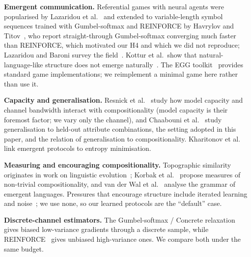 \textbf{Emergent communication.} Referential games with neural agents were popularised by Lazaridou et al.~\cite{lazaridou2016multi} and extended to variable-length symbol sequences trained with Gumbel-softmax and REINFORCE by Havrylov and Titov~\cite{havrylov2017emergence}, who report straight-through Gumbel-softmax converging much faster than REINFORCE, which motivated our H4 and which we did not reproduce; Lazaridou and Baroni survey the field~\cite{lazaridou2020emergent}. Kottur et al.\ show that natural-language-like structure does not emerge naturally~\cite{kottur2017natural}. The EGG toolkit~\cite{kharitonov2019egg} provides standard game implementations; we reimplement a minimal game here rather than use it.

\textbf{Capacity and generalisation.} Resnick et al.~\cite{resnick2019capacity} study how model capacity and channel bandwidth interact with compositionality (model capacity is their foremost factor; we vary only the channel), and Chaabouni et al.~\cite{chaabouni2020compositionality} study generalisation to held-out attribute combinations, the setting adopted in this paper, and the relation of generalisation to compositionality. Kharitonov et al.~\cite{kharitonov2019entropy} link emergent protocols to entropy minimisation.

\textbf{Measuring and encouraging compositionality.} Topographic similarity originates in work on linguistic evolution~\cite{brighton2006understanding}; Korbak et al.~\cite{korbak2020measuring} propose measures of non-trivial compositionality, and van der Wal et al.~\cite{wal2020grammar} analyse the grammar of emergent languages. Pressures that encourage structure include iterated learning~\cite{ren2020compositional} and noise~\cite{kuciski2021catalytic}; we use none, so our learned protocols are the ``default'' case.

\textbf{Discrete-channel estimators.} The Gumbel-softmax / Concrete relaxation~\cite{jang2016categorical,maddison2016concrete} gives biased low-variance gradients through a discrete sample, while REINFORCE~\cite{williams1992simple} gives unbiased high-variance ones. We compare both under the same budget.
